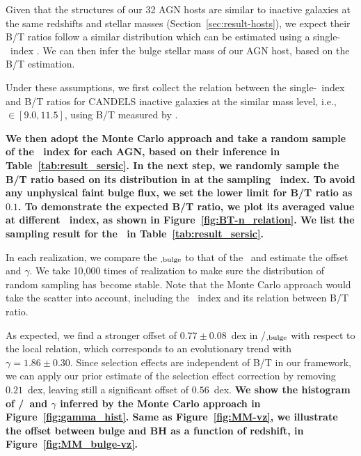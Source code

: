 \documentclass[apj]{emulateapj}
\begin{document}
Given that the structures of our 32 AGN hosts are similar to inactive
galaxies at the same redshifts and stellar masses
(Section~\ref{sec:result-hosts}), we expect their B/T ratios follow
a similar distribution which can be estimated using a single-\sersic\
index \citep{Bruce2014}. We can then infer the bulge stellar mass of our
AGN host, based on the B/T estimation.

Under these assumptions, we first collect the relation between the
single-\sersic\ index and B/T ratios for CANDELS inactive galaxies
at the similar mass level, i.e., \smass$\in [9.0, 11.5]$, using B/T
measured by \citet{Dimauro2018}. {\bf We then adopt the Monte Carlo approach
and take a random sample of the \sersic\ index for each AGN, based on their
inference in Table~\ref{tab:result_sersic}. In the next step, we randomly
sample the B/T ratio based on its distribution in \citet{Dimauro2018}
at the sampling \sersic\ index. To avoid any unphysical faint bulge flux, we
set the lower limit for B/T ratio as $0.1$. 
To demonstrate the expected B/T ratio, we plot its averaged value at
different \sersic\ index, as shown in Figure~\ref{fig:BT-n_relation}. 
We list the sampling result for the \bmass\ in Table~\ref{tab:result_sersic}.

In each realization, we compare the
\smass$_{\rm, bulge}$ to that of the \mbh\ and estimate the offset and $\gamma$. 
We take 10,000 times of realization to make sure the distribution of
random sampling has become stable. Note that the Monte Carlo approach would
take the scatter into account, including the \sersic\ index
and its relation between B/T ratio.
} 

As expected, we find a stronger offset of
$0.77\pm0.08$~dex in \mbh/\smass$_{\rm, bulge}$ with respect to the
local relation, which corresponds to an evolutionary trend with
$\gamma = 1.86\pm0.30$. Since selection effects are independent of B/T in
our framework, we can apply our prior estimate of the selection
effect correction by removing $0.21$~dex, leaving still a significant offset
of $0.56$~dex. {\bf We show the histogram of  \mbh/\smass\ and $\gamma$ inferred by
the Monte Carlo approach in Figure~\ref{fig:gamma_hist}. Same as
Figure~\ref{fig:MM-vz}, we illustrate the offset between bulge and BH
as a function of redshift, in Figure~\ref{fig:MM_bulge-vz}.}
\end{document}
